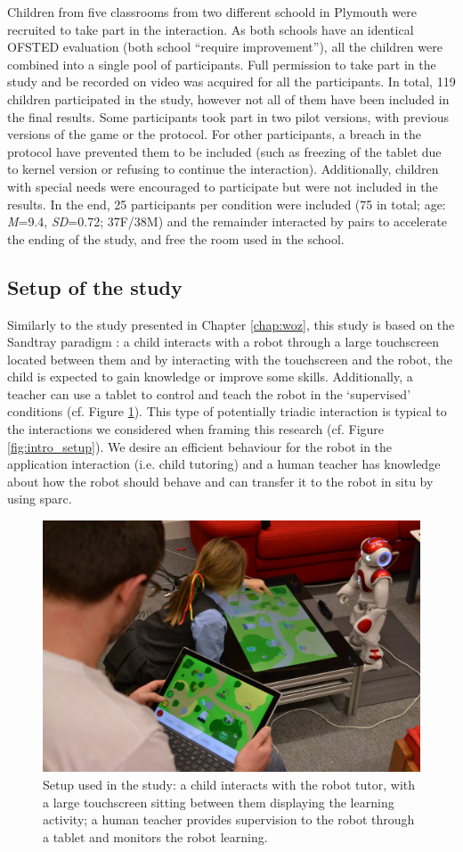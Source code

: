 Children from five classrooms from two different schoold in Plymouth were recruited to take part in the interaction. As both schools have an identical OFSTED evaluation (both school ``require improvement''), all the children were combined into a single pool of participants. Full permission to take part in the study and be recorded on video was acquired for all the participants. In total, 119 children participated in the study, however not all of them have been included in the final results. Some participants took part in two pilot versions, with previous versions of the game or the protocol. For other participants, a breach in the protocol have prevented them to be included (such as freezing of the tablet due to kernel version or refusing to continue the interaction). Additionally, children with special needs were encouraged to participate but were not included in the results. In the end, 25 participants per condition were included (75 in total; age: \textit{M}=9.4, \textit{SD}=0.72; 37F/38M) and the remainder interacted by pairs to accelerate the ending of the study, and free the room used in the school. 

\subsection{Setup of the study}

Similarly to the study presented in Chapter \ref{chap:woz}, this study is based on the Sandtray paradigm \citep{baxter2012touchscreen}: a child interacts with a robot through a large touchscreen located between them and by interacting with the touchscreen and the robot, the child is expected to gain knowledge or improve some skills. Additionally, a teacher can use a tablet to control and teach the robot in the `supervised' conditions (cf. Figure \ref{fig:tutoring_setup}). This type of potentially triadic interaction is typical to the interactions we considered when framing this research (cf. Figure \ref{fig:intro_setup}). We desire an efficient behaviour for the robot in the application interaction (i.e. child tutoring) and a human teacher has knowledge about how the robot should behave and can transfer it to the robot in situ by using \gls{sparc}.

\begin{figure}[ht]
	\centering
	\includegraphics[width=.5\textwidth]{setup.jpg}
	\caption{Setup used in the study: a child interacts with the robot tutor, with a large touchscreen sitting between them displaying the learning activity; a human teacher provides supervision to the robot through a tablet and monitors the robot learning.}
	\label{fig:tutoring_setup}
\end{figure}

